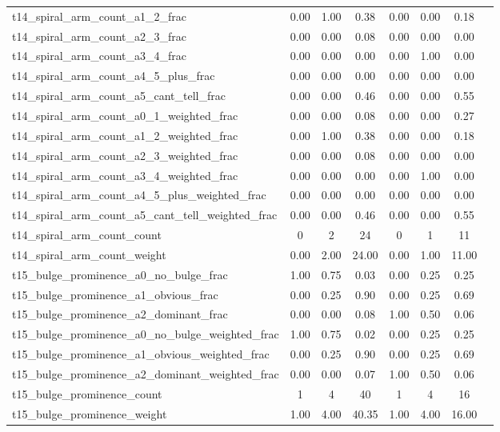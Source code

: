 \begin{table*}
{\begin{tabular}{@{}lccccccc}
t14\_spiral\_arm\_count\_a1\_2\_frac & 0.00 & 1.00 & 0.38 & 0.00 & 0.00 & 0.18 &\\
t14\_spiral\_arm\_count\_a2\_3\_frac & 0.00 & 0.00 & 0.08 & 0.00 & 0.00 & 0.00 &\\
t14\_spiral\_arm\_count\_a3\_4\_frac & 0.00 & 0.00 & 0.00 & 0.00 & 1.00 & 0.00 &\\
t14\_spiral\_arm\_count\_a4\_5\_plus\_frac & 0.00 & 0.00 & 0.00 & 0.00 & 0.00 & 0.00 &\\
t14\_spiral\_arm\_count\_a5\_cant\_tell\_frac & 0.00 & 0.00 & 0.46 & 0.00 & 0.00 & 0.55 &\\
t14\_spiral\_arm\_count\_a0\_1\_weighted\_frac & 0.00 & 0.00 & 0.08 & 0.00 & 0.00 & 0.27 &\\
t14\_spiral\_arm\_count\_a1\_2\_weighted\_frac & 0.00 & 1.00 & 0.38 & 0.00 & 0.00 & 0.18 &\\
t14\_spiral\_arm\_count\_a2\_3\_weighted\_frac & 0.00 & 0.00 & 0.08 & 0.00 & 0.00 & 0.00 &\\
t14\_spiral\_arm\_count\_a3\_4\_weighted\_frac & 0.00 & 0.00 & 0.00 & 0.00 & 1.00 & 0.00 &\\
t14\_spiral\_arm\_count\_a4\_5\_plus\_weighted\_frac & 0.00 & 0.00 & 0.00 & 0.00 & 0.00 & 0.00 &\\
t14\_spiral\_arm\_count\_a5\_cant\_tell\_weighted\_frac & 0.00 & 0.00 & 0.46 & 0.00 & 0.00 & 0.55 &\\
t14\_spiral\_arm\_count\_count & 0 & 2 & 24 & 0 & 1 & 11 &\\
t14\_spiral\_arm\_count\_weight & 0.00 & 2.00 & 24.00 & 0.00 & 1.00 & 11.00 &\\
t15\_bulge\_prominence\_a0\_no\_bulge\_frac & 1.00 & 0.75 & 0.03 & 0.00 & 0.25 & 0.25 &\\
t15\_bulge\_prominence\_a1\_obvious\_frac & 0.00 & 0.25 & 0.90 & 0.00 & 0.25 & 0.69 &\\
t15\_bulge\_prominence\_a2\_dominant\_frac & 0.00 & 0.00 & 0.08 & 1.00 & 0.50 & 0.06 &\\
t15\_bulge\_prominence\_a0\_no\_bulge\_weighted\_frac & 1.00 & 0.75 & 0.02 & 0.00 & 0.25 & 0.25 &\\
t15\_bulge\_prominence\_a1\_obvious\_weighted\_frac & 0.00 & 0.25 & 0.90 & 0.00 & 0.25 & 0.69 &\\
t15\_bulge\_prominence\_a2\_dominant\_weighted\_frac & 0.00 & 0.00 & 0.07 & 1.00 & 0.50 & 0.06 &\\
t15\_bulge\_prominence\_count & 1 & 4 & 40 & 1 & 4 & 16 &\\
t15\_bulge\_prominence\_weight & 1.00 & 4.00 & 40.35 & 1.00 & 4.00 & 16.00 &\\

\end{tabular}}
\end{table*}
